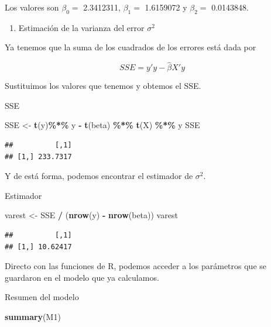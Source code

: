 \documentclass[
]{book}
\newenvironment{Shaded}{\begin{snugshade}}{\end{snugshade}}
\newcommand{\FunctionTok}[1]{\textcolor[rgb]{0.13,0.29,0.53}{\textbf{#1}}}
\newcommand{\NormalTok}[1]{#1}
\newcommand{\OtherTok}[1]{\textcolor[rgb]{0.56,0.35,0.01}{#1}}
\newcommand{\SpecialCharTok}[1]{\textcolor[rgb]{0.81,0.36,0.00}{\textbf{#1}}}
\providecommand{\tightlist}{%
  \setlength{\itemsep}{0pt}\setlength{\parskip}{0pt}}
\begin{document}
Los valores son \(\beta_0=\) 2.3412311, \(\beta_1=\) 1.6159072 y \(\beta_2=\) 0.0143848.

\begin{enumerate}
\def\labelenumi{\arabic{enumi})}
\setcounter{enumi}{1}
\tightlist
\item
  Estimación de la varianza del error \(\sigma^2\)
\end{enumerate}

Ya tenemos que la suma de los cuadrados de los errores está dada por

\[ SSE = y'y - \hat{\beta}X'y\]

Sustituimos los valores que tenemos y obtemos el SSE.

SSE

\begin{Shaded}
\begin{Highlighting}[]
\NormalTok{SSE }\OtherTok{\textless{}{-}} \FunctionTok{t}\NormalTok{(y)}\SpecialCharTok{\%*\%}\NormalTok{ y }\SpecialCharTok{{-}} \FunctionTok{t}\NormalTok{(beta) }\SpecialCharTok{\%*\%} \FunctionTok{t}\NormalTok{(X) }\SpecialCharTok{\%*\%}\NormalTok{ y}
\NormalTok{SSE}
\end{Highlighting}
\end{Shaded}

\begin{verbatim}
##          [,1]
## [1,] 233.7317
\end{verbatim}

Y de está forma, podemos encontrar el estimador de \(\sigma^2\).

Estimador

\begin{Shaded}
\begin{Highlighting}[]
\NormalTok{varest }\OtherTok{\textless{}{-}}\NormalTok{ SSE }\SpecialCharTok{/}\NormalTok{ (}\FunctionTok{nrow}\NormalTok{(y) }\SpecialCharTok{{-}} \FunctionTok{nrow}\NormalTok{(beta))}
\NormalTok{varest}
\end{Highlighting}
\end{Shaded}

\begin{verbatim}
##          [,1]
## [1,] 10.62417
\end{verbatim}

Directo con las funciones de R, podemos acceder a los parámetros que se guardaron en el modelo que ya calculamos.

Resumen del modelo

\begin{Shaded}
\begin{Highlighting}[]
\FunctionTok{summary}\NormalTok{(M1)}
\end{Highlighting}
\end{Shaded}
\end{document}

